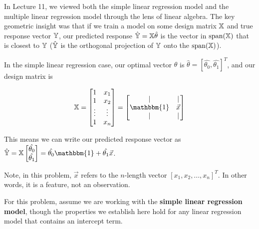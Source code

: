 \documentclass[addpoints, 12pt]{exam}
\theoremstyle{definition}
\newtheorem*{answer}{Answer}
\begin{document}
\begin{questions}
\question[7] In Lecture 11, we viewed both the simple linear regression model and the multiple linear regression model through the lens of linear algebra. The key geometric insight was that if we train a model on some design matrix $\Bbb{X}$ and true response vector $\Bbb{Y}$, our predicted response $\hat{\Bbb{Y}} = \Bbb{X} \hat{\theta}$ is the vector in $\text{span}(\Bbb{X})$ that is closest to $\Bbb{Y}$ ($\hat{\Bbb{Y}}$ is the orthogonal projection of $\Bbb{Y}$ onto the $\text{span}(\Bbb{X})$). 

In the simple linear regression case, our optimal vector $\theta$ is $\hat{\theta} = [\hat{\theta_0}, \hat{\theta_1}]^T$, and our design matrix is

$$\Bbb{X} = \begin{bmatrix} 1 & x_1 \\ 1 & x_2 \\ \vdots & \vdots \\ 1 & x_n \end{bmatrix} = \begin{bmatrix} | & | \\ \mathbbm{1} & \vec{x} \\ | & | \end{bmatrix}$$

This means we can write our predicted response vector as $\hat{\Bbb{Y}} = \Bbb{X} \begin{bmatrix} \hat{\theta_0} \\ \hat{\theta_1} \end{bmatrix} = \hat{\theta_0} \mathbbm{1} + \hat{\theta_1} \vec{x}$. 

Note, in this problem, $\vec{x}$ refers to the $n$-length vector $[x_1, x_2, ..., x_n]^T$. In other words, it is a feature, not an observation.

For this problem, assume we are working with the \textbf{simple linear regression model}, though the properties we establish here hold for any linear regression model that contains an intercept term.

\end{questions}
\end{document}
